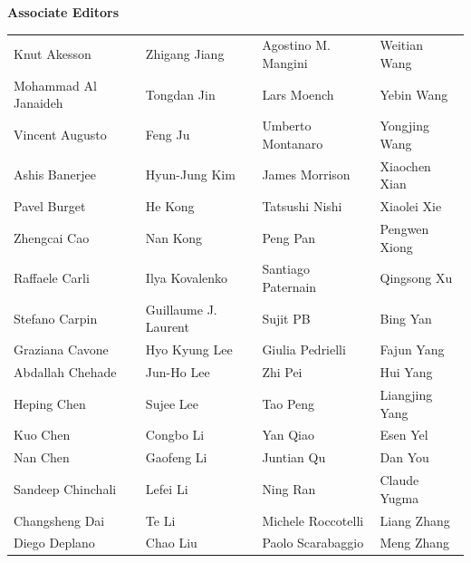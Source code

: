 \documentclass[
	openany, %
	parskip=full, %
	12pt, %
	a4paper, %
]{conferencebooklet} %
\begin{document}
\large \textbf{Associate Editors} \normalsize
\begin{table}[h!]
    \begin{tabular}{llll}
             Knut	Akesson	&
             Zhigang	Jiang	&
             Agostino M. Mangini	&
             Weitian	Wang	\\
             Mohammad	Al Janaideh	&
             Tongdan	Jin	&
             Lars	Moench	&
             Yebin	Wang	\\
             Vincent	Augusto	&
             Feng	Ju	&
             Umberto	Montanaro	&
             Yongjing	Wang	\\
             Ashis	Banerjee	&
             Hyun-Jung	Kim	&
             James	Morrison	&
             Xiaochen	Xian	\\
             Pavel	Burget	&
             He	Kong	&
             Tatsushi	Nishi	&
             Xiaolei	Xie	\\
             Zhengcai	Cao	&
             Nan	Kong	&
             Peng	Pan	&
             Pengwen	Xiong	\\
             Raffaele	Carli	&
             Ilya	Kovalenko	&
             Santiago	Paternain	&
             Qingsong	Xu	\\
             Stefano	Carpin	&
             Guillaume J.	Laurent	&
             Sujit	PB	&
             Bing	Yan	\\
             Graziana	Cavone	&
             Hyo Kyung	Lee	&
             Giulia	Pedrielli	&
             Fajun	Yang	\\
             Abdallah	Chehade	&
             Jun-Ho	Lee	&
             Zhi	Pei	&
             Hui	Yang	\\
             Heping	Chen	&
             Sujee	Lee	&
             Tao	Peng	&
             Liangjing	Yang	\\
             Kuo	Chen	&
             Congbo	Li	&
             Yan	Qiao	&
             Esen	Yel	\\
             Nan	Chen	&
             Gaofeng	Li	&
             Juntian	Qu	&
             Dan	You	\\
             Sandeep	Chinchali	&
             Lefei	Li	&
             Ning	Ran	&
             Claude	Yugma	\\
             Changsheng	Dai	&
             Te	Li	&
             Michele	Roccotelli	&
             Liang	Zhang	\\
             Diego	Deplano	&
             Chao	Liu	&
             Paolo	Scarabaggio	&
             Meng	Zhang	\\

\end{tabular}
\end{table}
\end{document}
